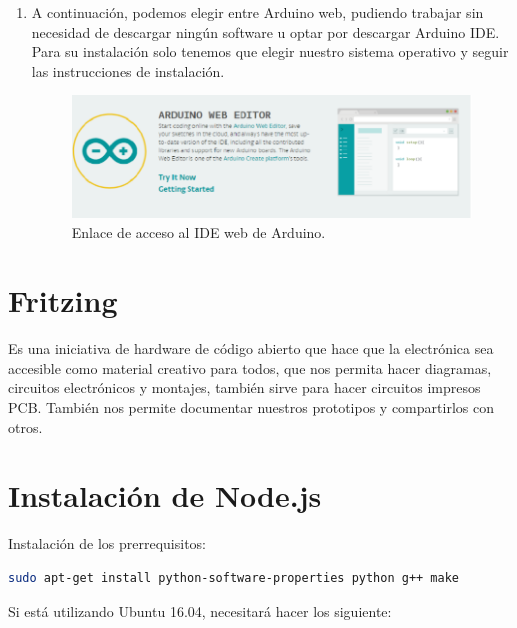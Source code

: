 \begin{appendix}
\begin{enumerate}
\item A continuación, podemos elegir entre Arduino web, pudiendo trabajar sin necesidad de descargar ningún software u
optar por descargar Arduino IDE. Para su instalación solo tenemos que elegir nuestro sistema operativo y
seguir las instrucciones de instalación.

\begin{figure}[H]
  \begin{center}
    \includegraphics[scale=0.3]{imagenes/arduino_web_ide.png}
  \end{center}
  \label{fig:descarga_arduino}
 \caption{Enlace de acceso al IDE web de Arduino.}
 \end{figure}

\end{enumerate}

\section{Fritzing}

Es una iniciativa de hardware de código abierto que hace que la electrónica sea accesible como
material creativo para todos, que nos permita hacer diagramas, circuitos electrónicos y
montajes, también sirve para hacer circuitos impresos PCB.
También nos permite documentar nuestros prototipos y compartirlos con otros.






\section{Instalación de Node.js}

Instalación de los prerrequisitos:\\

\begin{lstlisting}[language=bash]
sudo apt-get install python-software-properties python g++ make
\end{lstlisting}


Si está utilizando Ubuntu 16.04, necesitará hacer los siguiente:\\


\end{appendix}
